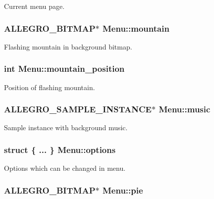 \-Current menu page. \hypertarget{structMenu_a3a957c0b3a961e3c2be9001c15e82208}{
\subsubsection[{mountain}]{\setlength{\rightskip}{0pt plus 5cm}\-A\-L\-L\-E\-G\-R\-O\-\_\-\-B\-I\-T\-M\-A\-P$\ast$ {\bf \-Menu\-::mountain}}}\label{structMenu_a3a957c0b3a961e3c2be9001c15e82208}
\-Flashing mountain in background bitmap. \hypertarget{structMenu_a10770a9453a92c77d64c7fdb0e34e725}{
\subsubsection[{mountain\-\_\-position}]{\setlength{\rightskip}{0pt plus 5cm}int {\bf \-Menu\-::mountain\-\_\-position}}}\label{structMenu_a10770a9453a92c77d64c7fdb0e34e725}
\-Position of flashing mountain. \hypertarget{structMenu_a7b8c42bd64118eb18dceafbd9ac8b3d5}{
\subsubsection[{music}]{\setlength{\rightskip}{0pt plus 5cm}\-A\-L\-L\-E\-G\-R\-O\-\_\-\-S\-A\-M\-P\-L\-E\-\_\-\-I\-N\-S\-T\-A\-N\-C\-E$\ast$ {\bf \-Menu\-::music}}}\label{structMenu_a7b8c42bd64118eb18dceafbd9ac8b3d5}
\-Sample instance with background music. \hypertarget{structMenu_a6ee9749efa96939d50728015a3fd6609}{
\subsubsection[{options}]{\setlength{\rightskip}{0pt plus 5cm}struct \{ ... \}   {\bf \-Menu\-::options}}}\label{structMenu_a6ee9749efa96939d50728015a3fd6609}
\-Options which can be changed in menu. \hypertarget{structMenu_a397eb035f88ef8138c4ba29f3fc1d63c}{
\subsubsection[{pie}]{\setlength{\rightskip}{0pt plus 5cm}\-A\-L\-L\-E\-G\-R\-O\-\_\-\-B\-I\-T\-M\-A\-P$\ast$ {\bf \-Menu\-::pie}}}\label{structMenu_a397eb035f88ef8138c4ba29f3fc1d63c}
